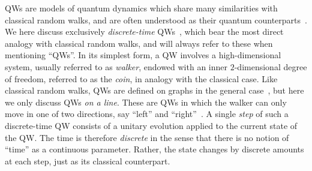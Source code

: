 \acp{QW} are models of quantum dynamics which share many similarities with classical random walks, and are often understood as their quantum counterparts~\cite{aharonov2000quantum,kempe2003quantum,venegasandraca2012quantum,portugal2013quantum}.
We here discuss exclusively \emph{discrete-time} \acp{QW}~\cite{chandrashekar2008optimizing}, which bear the most direct analogy with classical random walks, and will always refer to these when mentioning ``QWs''.
In its simplest form, a \ac{QW} involves a high-dimensional system, usually referred to as \emph{walker}, endowed with an inner $2$-dimensional degree of freedom, referred to as the \emph{coin}, in analogy with the classical case.
Like classical random walks, QWs are defined on graphs in the general case~\cite{aharonov2000quantum}, but here we only discuss QWs \emph{on a line}. These are QWs in which the walker can only move in one of two directions, say ``left'' and ``right''~\cite{ambainis2001onedimensional}.
A single \textit{step} of such a discrete-time \ac{QW} consists of a unitary evolution applied to the current state of the \ac{QW}. The time is therefore \emph{discrete} in the sense that there is no notion of ``time'' as a continuous parameter. Rather, the state changes by discrete amounts at each step, just as its classical counterpart.


